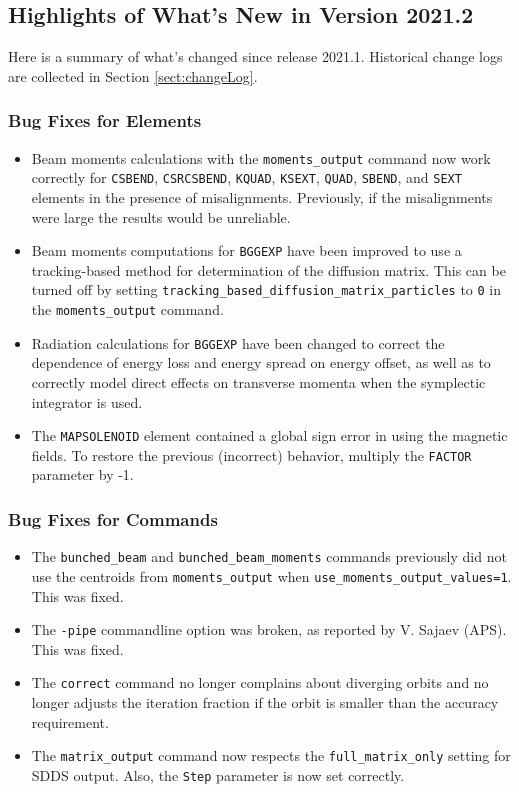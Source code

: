 \documentclass[11pt]{article}
\begin{document}
\subsection{Highlights of What's New in Version 2021.2}

Here is a summary of what's changed since release 2021.1.  Historical change logs are collected in Section
\ref{sect:changeLog}.

\subsubsection{Bug Fixes for Elements}

\begin{itemize}
\item Beam moments calculations with the \verb|moments_output| command now work correctly for
  \verb|CSBEND|, \verb|CSRCSBEND|, \verb|KQUAD|, \verb|KSEXT|, \verb|QUAD|, \verb|SBEND|,  and \verb|SEXT|
  elements in the presence of misalignments. Previously, if the misalignments were large the results would
  be unreliable.
\item Beam moments computations for \verb|BGGEXP| have been improved to use a tracking-based method for
  determination of the diffusion matrix. This can be turned off by setting \verb|tracking_based_diffusion_matrix_particles|
  to \verb|0| in the \verb|moments_output| command.
\item Radiation calculations for \verb|BGGEXP| have been changed to correct the dependence of energy loss and
  energy spread on energy offset, as well as to correctly model direct effects on transverse momenta when the
  symplectic integrator is used.
\item The \verb|MAPSOLENOID| element contained a global sign error in using the magnetic fields. To restore the 
  previous (incorrect) behavior, multiply the \verb|FACTOR| parameter by -1.
\end{itemize}

\subsubsection{Bug Fixes for Commands}
\begin{itemize}
\item The \verb|bunched_beam| and \verb|bunched_beam_moments| commands previously did not use the centroids
 from \verb|moments_output| when \verb|use_moments_output_values=1|. This was fixed.
\item The \verb|-pipe|  commandline option was broken, as reported by V. Sajaev (APS). This was fixed.
\item The \verb|correct| command no longer complains about diverging orbits and no longer adjusts the
  iteration fraction if the orbit is smaller than the accuracy requirement.
\item The \verb|matrix_output| command now respects the \verb|full_matrix_only| setting for SDDS output.
  Also, the \verb|Step| parameter is now set correctly.
\end{itemize}
\end{document}
